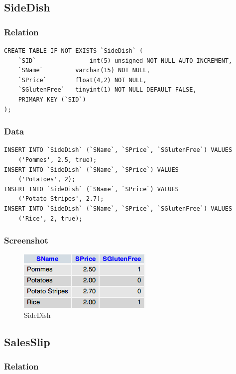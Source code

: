 \documentclass[10pt, a4paper]{article}
\begin{document}
\subsection{SideDish}

\subsubsection{Relation}

\begin{verbatim}
CREATE TABLE IF NOT EXISTS `SideDish` (
  	`SID`         		int(5) unsigned NOT NULL AUTO_INCREMENT,
  	`SName`       	varchar(15) NOT NULL,
  	`SPrice`      	float(4,2) NOT NULL,
  	`SGlutenFree` 	tinyint(1) NOT NULL DEFAULT FALSE,
  	PRIMARY KEY (`SID`)
);
\end{verbatim}

\subsubsection{Data}

\begin{verbatim}
INSERT INTO `SideDish` (`SName`, `SPrice`, `SGlutenFree`) VALUES
  	('Pommes', 2.5, true);
INSERT INTO `SideDish` (`SName`, `SPrice`) VALUES
  	('Potatoes', 2);
INSERT INTO `SideDish` (`SName`, `SPrice`) VALUES
  	('Potato Stripes', 2.7);
INSERT INTO `SideDish` (`SName`, `SPrice`, `SGlutenFree`) VALUES
  	('Rice', 2, true);
\end{verbatim}

\subsubsection{Screenshot}

\begin{figure}[htb]
	\centering
	\includegraphics[scale=0.9]{fig/sidedish.png}
	\caption{SideDish}
\end{figure}

\subsection{SalesSlip}

\subsubsection{Relation}
\end{document}
